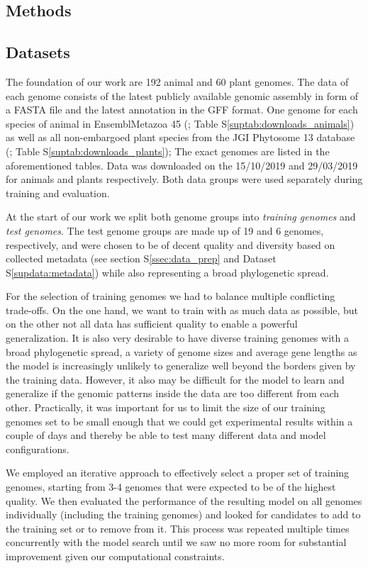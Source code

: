\documentclass{bioinfo}
\newcounter{suptab}
\newcounter{supdata}
\begin{document}
\begin{methods}
\section{Methods}
\subsection{Datasets}
The foundation of our work are 192 animal and 60 plant genomes. The data of each 
genome consists of the latest publicly available genomic assembly in form of a 
FASTA file and the latest annotation in the GFF format. One genome for each species of animal 
in EnsemblMetazoa 45 (\cite{howe2020ensembl}; Table S\ref{suptab:downloads_animals}) 
as well as all non-embargoed plant species from the JGI Phytosome 13 database 
(\cite{goodstein2012phytozome}; Table S\ref{suptab:downloads_plants}); The exact 
genomes are listed in the aforementioned tables.
Data was downloaded on the 15/10/2019 and 29/03/2019 for animals and plants respectively. 
Both data groups were used separately during training and evaluation. 

At the start of our work we split both genome groups into {\it training genomes} and 
{\it test genomes}. The test genome groups are made up of 19 and 6 genomes, 
respectively, and were chosen to be of decent quality and diversity based on collected 
metadata (see section S\ref{ssec:data_prep} and Dataset S\ref{supdata:metadata}) 
while also representing a broad phylogenetic spread. 

For the selection of training genomes we had to balance multiple conflicting 
trade-offs. On the one hand, we want to train with as much data as possible, but 
on the other
not all data has sufficient quality to enable a powerful generalization. It is 
also very desirable to have diverse training genomes with a broad phylogenetic spread, 
a variety of genome sizes and average gene lengths as the model is increasingly unlikely to generalize 
well beyond the borders given by the training data. However, it also may be difficult 
for the model to learn and generalize if the genomic patterns inside the data are 
too different from each other. Practically, it was important for us to limit the size of
our training genomes set to be small enough that we could get experimental 
results within a couple of days and thereby be able to test many different data and 
model configurations.

We employed an iterative approach to effectively select a proper set of training 
genomes, starting from 3-4 genomes that were expected to be of the 
highest quality. We then evaluated the performance of the resulting model on all 
genomes individually (including the training genomes) and looked for candidates to 
add to the training set or to remove from it. This process was repeated multiple 
times concurrently with the model search until we saw no more room for substantial 
improvement given our computational constraints.


\end{methods}
\end{document}
